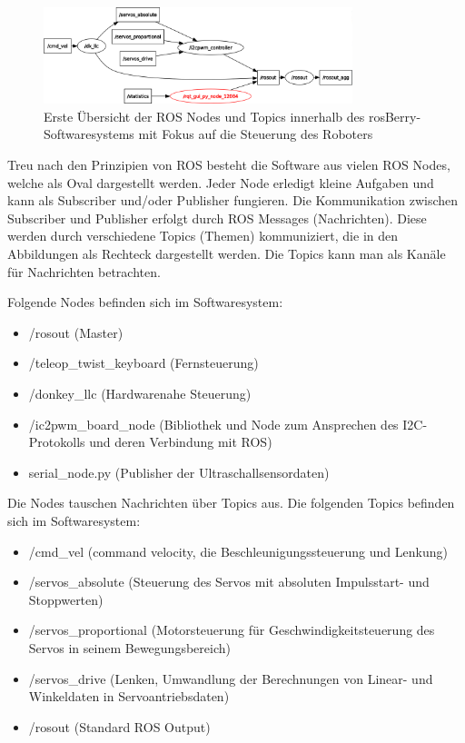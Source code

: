 \documentclass[conference]{IEEEtran}
\begin{document}
	\begin{figure}[!ht] 
		\centering
		\includegraphics[width=9cm]{img/rosgraph.png}
		\caption{Erste Übersicht der ROS Nodes und Topics innerhalb des rosBerry-Softwaresystems mit Fokus auf die Steuerung des Roboters}
		\label{rosgraph}
	\end{figure}
	
	Treu nach den Prinzipien von ROS besteht die Software aus vielen ROS Nodes, welche als Oval dargestellt werden. 
	Jeder Node erledigt kleine Aufgaben und kann als Subscriber und/oder Publisher fungieren.
	Die Kommunikation zwischen Subscriber und Publisher erfolgt durch ROS Messages (Nachrichten).
	Diese werden durch verschiedene Topics (Themen) kommuniziert, die in den Abbildungen als Rechteck dargestellt werden.
	Die Topics kann man als Kanäle für Nachrichten betrachten.
	
	Folgende Nodes befinden sich im Softwaresystem:
	\begin{itemize}
		\item /rosout (Master)
		\item /teleop\_twist\_keyboard (Fernsteuerung)
		\item /donkey\_llc (Hardwarenahe Steuerung)
		\item /ic2pwm\_board\_node (Bibliothek und Node zum Ansprechen des I2C-Protokolls und deren Verbindung mit ROS)
		\item serial\_node.py (Publisher der Ultraschallsensordaten)
	\end{itemize}
	
	Die Nodes tauschen Nachrichten über Topics aus.
	Die folgenden Topics befinden sich im Softwaresystem:
	\begin{itemize}
		\item /cmd\_vel (command velocity, die Beschleunigungssteuerung und 
		Lenkung)
		\item /servos\_absolute (Steuerung des Servos mit absoluten Impulsstart- und Stoppwerten)
		\item /servos\_proportional (Motorsteuerung für Geschwindigkeitsteuerung des Servos in seinem Bewegungsbereich)
		\item /servos\_drive (Lenken, Umwandlung der Berechnungen von Linear- und Winkeldaten in Servoantriebsdaten)
		\item /rosout (Standard ROS Output)
	\end{itemize}
\end{document}
